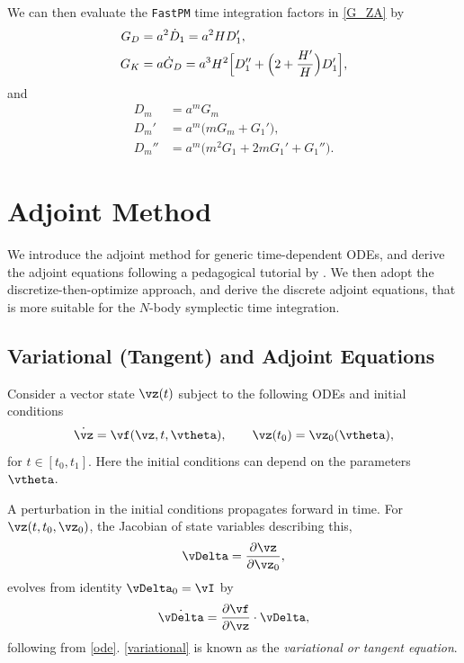\documentclass[modern, trackchanges, dvipsnames]{aastex631}
\newcommand{\p}{\partial}
\begin{document}
We can then evaluate the \texttt{FastPM} time integration factors in
\eqref{G_ZA} by
\begin{align}
  G_D &= a^2 \dot D_1 = a^2 H D_1', \nonumber\\
  G_K &= a \dot G_D = a^3 H^2 \Bigl[
    D_1'' + \Bigl(2 + \frac{H'}H \Bigr) D_1'
  \Bigr],
  \label{G_eval}
\end{align}
and
\begin{align}
  D_m &= a^m G_m \nonumber\\
  D_m' &= a^m \bigl( m G_m + G_1' \Bigr), \nonumber\\
  D_m'' &= a^m \bigl( m^2 G_1 + 2m G_1' + G_1'' \Bigr).
\end{align}


\vspace{1em}
\section{Adjoint Method}
\label{app:adj}

We introduce the adjoint method for generic time-dependent ODEs, and
derive the adjoint equations following a pedagogical tutorial by
\citet{Bradley2019}.
We then adopt the discretize-then-optimize approach, and derive the
discrete adjoint equations, that is more suitable for the $N$-body
symplectic time integration.


\vspace{1em}
\subsection{Variational (Tangent) and Adjoint Equations}

Consider a vector state $\vz(t)$ subject to the following ODEs and
initial conditions
%
\begin{equation}
\dot\vz = \vf(\vz, t, \vtheta),
\qquad
\vz(t_0) = \vz_0(\vtheta),
\label{ode}
\end{equation}
%
for $t \in [t_0, t_1]$.
Here the initial conditions can depend on the parameters $\vtheta$.

A perturbation in the initial conditions propagates forward in time.
For $\vz(t, t_0, \vz_0)$, the Jacobian of state variables describing
this,
%
\begin{equation}
\vDelta = \frac{\p\vz}{\p\vz_0},
\end{equation}
%
evolves from identity $\vDelta_0 = \vI$ by
%
\begin{equation}
\dot\vDelta = \frac{\p\vf}{\p\vz} \cdot \vDelta,
\label{variational}
\end{equation}
%
following from \eqref{ode}.
\eqref{variational} is known as the \emph{variational or tangent
equation}.
\end{document}
